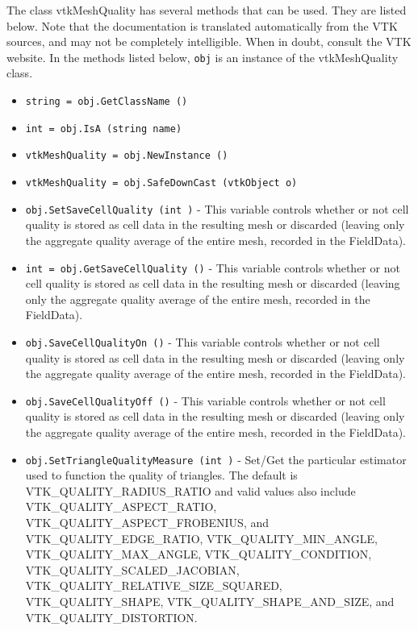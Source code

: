 The class vtkMeshQuality has several methods that can be used.
  They are listed below.
Note that the documentation is translated automatically from the VTK sources,
and may not be completely intelligible.  When in doubt, consult the VTK website.
In the methods listed below, \verb|obj| is an instance of the vtkMeshQuality class.
\begin{itemize}
\item  \verb|string = obj.GetClassName ()|

\item  \verb|int = obj.IsA (string name)|

\item  \verb|vtkMeshQuality = obj.NewInstance ()|

\item  \verb|vtkMeshQuality = obj.SafeDownCast (vtkObject o)|

\item  \verb|obj.SetSaveCellQuality (int )| -  This variable controls whether or not cell quality is stored as
 cell data in the resulting mesh or discarded (leaving only the
 aggregate quality average of the entire mesh, recorded in the
 FieldData).

\item  \verb|int = obj.GetSaveCellQuality ()| -  This variable controls whether or not cell quality is stored as
 cell data in the resulting mesh or discarded (leaving only the
 aggregate quality average of the entire mesh, recorded in the
 FieldData).

\item  \verb|obj.SaveCellQualityOn ()| -  This variable controls whether or not cell quality is stored as
 cell data in the resulting mesh or discarded (leaving only the
 aggregate quality average of the entire mesh, recorded in the
 FieldData).

\item  \verb|obj.SaveCellQualityOff ()| -  This variable controls whether or not cell quality is stored as
 cell data in the resulting mesh or discarded (leaving only the
 aggregate quality average of the entire mesh, recorded in the
 FieldData).

\item  \verb|obj.SetTriangleQualityMeasure (int )| -  Set/Get the particular estimator used to function the quality of triangles.
 The default is VTK\_QUALITY\_RADIUS\_RATIO and valid values also include
 VTK\_QUALITY\_ASPECT\_RATIO, VTK\_QUALITY\_ASPECT\_FROBENIUS, and VTK\_QUALITY\_EDGE\_RATIO,
 VTK\_QUALITY\_MIN\_ANGLE, VTK\_QUALITY\_MAX\_ANGLE, VTK\_QUALITY\_CONDITION,
 VTK\_QUALITY\_SCALED\_JACOBIAN, VTK\_QUALITY\_RELATIVE\_SIZE\_SQUARED,
 VTK\_QUALITY\_SHAPE, VTK\_QUALITY\_SHAPE\_AND\_SIZE, and VTK\_QUALITY\_DISTORTION.


\end{itemize}
